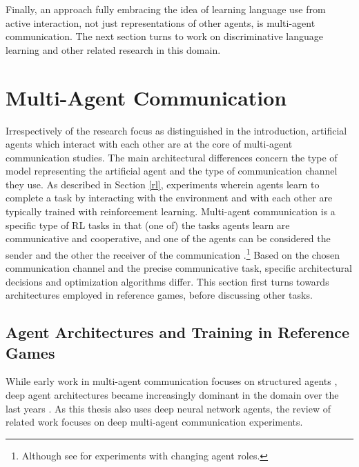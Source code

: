 Finally, an approach fully embracing the idea of learning language use from active interaction, not just representations of other agents,  is multi-agent communication. The next section turns to work on discriminative language learning and other related research in this domain.

\section{Multi-Agent Communication}
\label{mac}
Irrespectively of the research focus as distinguished in the introduction, artificial agents which interact with each other are at the core of multi-agent communication studies.
The main architectural differences concern the type of model representing the artificial agent and the type of communication channel they use.
As described in Section \ref{rl}, experiments wherein agents learn to complete a task by interacting with the environment and with each other are typically trained with reinforcement learning. Multi-agent communication is a specific type of RL tasks in that (one of) the tasks agents learn are communicative and cooperative, and one of the agents can be considered the sender and the other the receiver of the communication \parencite[cf.][]{tan1993multi, lazaridou2016multi}.\footnote{Although see \cite{bouchacourt2019miss} for experiments with changing agent roles.}
Based on the chosen communication channel and the precise communicative task, specific architectural decisions and optimization algorithms differ. This section first turns towards architectures employed in reference games, before discussing other tasks.

\subsection{Agent Architectures and Training in Reference Games}
\label{multi_agent_arch}

While early work in multi-agent communication focuses on structured agents \parencite[e.~g.,~see][for reviews]{christiansen2003language, cangelosi2002symbol}, deep agent architectures became increasingly dominant in the domain over the last years \parencite{lazaridou2020emergent}. As this thesis also uses deep neural network agents, the review of related work focuses on deep multi-agent communication experiments. 


